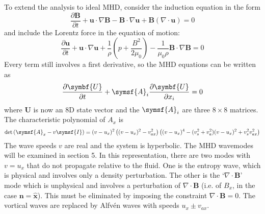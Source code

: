 \documentclass{jknotes}
\newcommand{\B}{\symbf{B}}
\renewcommand{\u}{\symbf{u}}
\begin{document}
To extend the analysis to ideal MHD, consider the induction equation in the
form
\begin{equation}
	\frac{\partial \B}{\partial t} + \u \cdot \nabla \B - \B \cdot \nabla \u +
	\B (\nabla \cdot \u) = 0
\end{equation}
and include the Lorentz force in the equation of motion:
\begin{equation}
	\frac{\partial \u}{\partial t} + \u \cdot \nabla \u +
	\frac{1}{\rho}\left(p + \frac{B^2}{2\mu_0}\right) - \frac{1}{\mu_0 \rho}
		\B \cdot \nabla \B = 0
\end{equation}
Every term still involves a first derivative, so the MHD equations can be
written as
\begin{equation}
	\frac{\partial \symbf{U}}{\partial t} + \symsf{A}_i \frac{\partial
	\symbf{U}}{\partial x_i} = 0 
\end{equation}
where $\symbf{U}$ is now an 8D state vector and the $\symsf{A}_i$ are three
$8\times8$ matrices. The characteristic polynomial of $A_x$ is
\begin{equation}
	\text{det}\left( \symsf{A}_x - v \symsf{I}\right) = (v-u_x)^2 \left(
	(v-u_x)^2 - v_{ax}^2\right)\left( (v-u_x)^4 -
	(v_s^2+v_a^2)(v-u_x)^2 + v_s^2 v_{ax}^2\right)
\end{equation}
The wave speeds $v$ are real and the system is hyperbolic. The MHD wavemodes
will be examined in section 5. In this representation, there are two modes
with $v = u_x$ that do not propagate relative to the fluid. One is the entropy
wave, which is physical and involves only a density perturbation. The other is
the `$\nabla \cdot \B$' mode which is unphysical and involves a perturbation
of $\nabla \cdot \B$ (i.e. of $B_x$, in the case $\symbf{n} =
\hat{\symbf{x}}$). This must be eliminated by imposing the constraint $\nabla
\cdot \B = 0$. The vortical waves are replaced by Alfv\'{e}n waves with speeds
$u_x \pm v_{ax}$.
\end{document}
